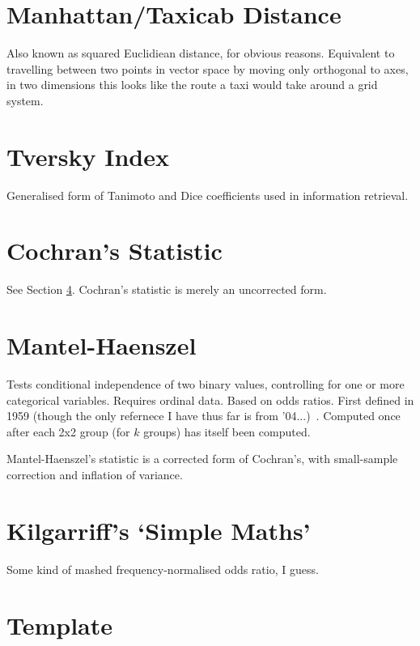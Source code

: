 \documentclass[11pt]{article}
\begin{document}
\section{Manhattan/Taxicab Distance}
\label{section:manhattan}
Also known as squared Euclidiean distance, for obvious reasons.  Equivalent to travelling between two points in vector space by moving only orthogonal to axes, in two dimensions this looks like the route a taxi would take around a grid system.




\section{Tversky Index}
Generalised form of Tanimoto and Dice coefficients used in information retrieval.



\section{Cochran's Statistic}
See Section \ref{section:mantelhaenszel}.  Cochran's statistic is merely an uncorrected form.

\section{Mantel-Haenszel}
\label{section:mantelhaenszel}
Tests conditional independence of two binary values, controlling for one or more categorical variables.  Requires ordinal data.  Based on odds ratios.  First defined in 1959 {\color{red} (though the only refernece I have thus far is from '04...)}~\cite{mantel2004statistical}.  Computed once after each 2x2 group (for $k$ groups) has itself been computed.

Mantel-Haenszel's statistic is a corrected form of Cochran's, with small-sample correction and inflation of variance.


\section{Kilgarriff's `Simple Maths'}
Some kind of mashed frequency-normalised odds ratio, I guess.


\section{Template} %
\end{document}
